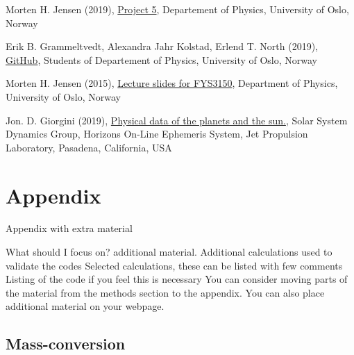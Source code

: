 \documentclass{article}
\begin{document}
\begin{thebibliography}{}

Morten H. Jensen (2019), \href{https://github.com/CompPhysics/ComputationalPhysics/blob/master/doc/Projects/2019/Project5/SolarSystem/pdf/SolarSystem.pdf}{Project 5}, Departement of Physics, University of Oslo, Norway

Erik B. Grammeltvedt, Alexandra Jahr Kolstad, Erlend T. North (2019), \href{https://github.com/Erikbgram/Fys3150}{GitHub}, Students of Departement of Physics, University of Oslo, Norway

Morten H. Jensen (2015), \href{https://github.com/CompPhysics/ComputationalPhysics/blob/master/doc/Lectures/lectures2015.pdf}{Lecture slides for FYS3150}, Department of Physics, University of Oslo, Norway

Jon. D. Giorgini (2019), \href{https://ssd.jpl.nasa.gov/horizons.cgi#top}{Physical data of the planets and the sun.}, Solar System Dynamics Group, Horizons On-Line Ephemeris System, Jet Propulsion Laboratory, Pasadena, California, USA


\end{thebibliography}


\vspace{1cm}


\appendix
\section{Appendix} \label{sec:Appendix}

Appendix with extra material


What should I focus on? additional material.
Additional calculations used to validate the codes
Selected calculations, these can be listed with few comments
Listing of the code if you feel this is necessary
You can consider moving parts of the material from the methods section to the appendix. You can also place additional material on your webpage.

\subsection{Mass-conversion} \label{app:mass}
\end{document}
